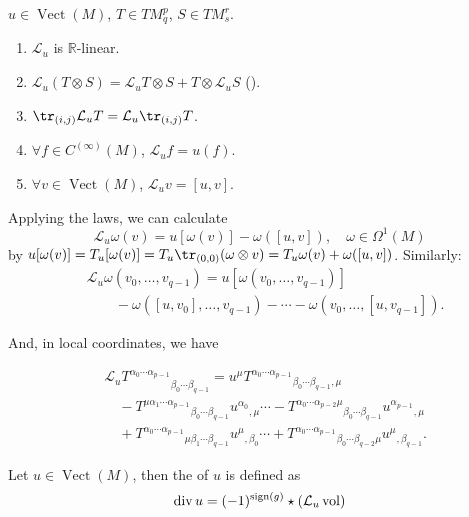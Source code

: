 \documentclass[openany, oneside, a5paper]{book}
\DeclareMathOperator{\Vect}{Vect}
\begin{document}
\begin{theorem}
    $u \in \Vect(M)$, $T \in TM^p_q$, $S \in TM^r_s$.
    \begin{enumerate}
        \item $\mathcal L_u $ is $\mathbb R$-linear.
        \item $\mathcal L_u (T \otimes S) = \mathcal L_u T \otimes S + T \otimes \mathcal L_u S$ ().
        \item $\tr_{(i, j)} \mathcal L_u T = \mathcal L_u \tr_{(i, j)} T$.
        \item $\forall f \in C^{(\infty)}(M)$, $\mathcal L_u f = u(f)$.
        \item $\forall v \in \Vect(M)$, $\mathcal L_u v = [u, v]$.
    \end{enumerate}
\end{theorem}

Applying the laws, we can calculate
\begin{equation}
    \mathcal L_u \omega(v) = u[\omega(v)] - \omega([u, v]),
    \quad
    \omega \in \Omega^1(M)
\end{equation}
by $u [\omega(v)] = T_u [\omega(v)] = T_u \tr_{(0, 0)} (\omega \otimes v) = T_u \omega(v) + \omega([u, v])$.
Similarly:
\begin{align}
    &\mathcal L_u \omega(v_0, \ldots, v_{q - 1}) 
    = u[\omega(v_0, \ldots, v_{q - 1})] 
    \\
    &\qquad - \omega([u, v_0], \ldots, v_{q - 1})
    - \cdots - \omega(v_0, \ldots, [u, v_{q - 1}]).
\end{align}

And, in local coordinates, we have

\begin{align}
    &{\mathcal L_u T^{\alpha_0 \cdots \alpha_{p-1}}}_{\beta_0 \cdots \beta_{q-1}}
    = u^\mu {T^{\alpha_0 \cdots \alpha_{p-1}}}_{\beta_0 \cdots \beta_{q-1} ,\mu}
    \\
    &\quad
    - {T^{\mu \alpha_1 \cdots \alpha_{p-1}}}_{\beta_0 \cdots \beta_{q-1}} {u^{\alpha_0}}_{,\mu}
    \cdots - {T^{\alpha_0 \cdots \alpha_{p-2} \mu}}_{\beta_0 \cdots \beta_{q-1}} {u^{\alpha_{p-1}}}_{,\mu} 
    \\
    &\quad
    + {T^{\alpha_0 \cdots \alpha_{p-1}}}_{\mu\beta_1 \cdots \beta_{q-1}} {u^{\mu}}_{,\beta_0}
    \cdots + {T^{\alpha_0 \cdots \alpha_{p-1}}}_{\beta_0 \cdots \beta_{q-2} \mu} {u^{\mu}}_{,\beta_{q-1}}.
\end{align}

\begin{definition}[Divergence]
    Let $u \in \Vect(M)$, then the  of $u$ is defined as
    \begin{equation}
        \operatorname{div} u = (-1)^{\operatorname{sign}(g)} \star (\mathcal L_u \operatorname{vol})
    \end{equation}
\end{definition}
\end{document}

